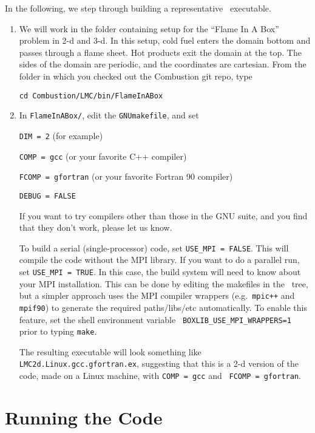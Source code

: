 In the following, we step through building a representative \lmc\ executable.
\begin{enumerate}
\item We will work in the folder containing setup for the ``Flame In A Box'' problem in 2-d and 3-d.
In this setup, cold fuel enters the domain bottom and passes through a flame sheet.
Hot products exit the domain at the top.  The sides of the domain are periodic, and the coordinates are
cartesian. From the folder in which you checked out the {\sf Combustion} git repo,
  type
\begin{verbatim}
cd Combustion/LMC/bin/FlameInABox
\end{verbatim}

\item In {\tt FlameInABox/}, edit the {\tt GNUmakefile}, and set

{\tt DIM = 2} (for example)

{\tt COMP = gcc} (or your favorite C++ compiler)

{\tt FCOMP = gfortran} (or your favorite Fortran 90 compiler)

{\tt DEBUG = FALSE}

If you want to try compilers other than those in the GNU suite, and you find that they don't
work, please let us know.

To build a serial (single-processor) code, set {\tt USE\_MPI = FALSE}.
This will compile the code without the MPI library.  If you want to do
a parallel run, set {\tt USE\_MPI = TRUE}.  In this
case, the build system will need to know about your MPI installation.
This can be done by editing the makefiles in the \boxlib\ tree, but a
simpler approach uses the MPI compiler wrappers
(e.g.\ {\tt mpic++} and {\tt mpif90}) to generate the 
required paths\slash libs\slash etc automatically.  To enable this
feature, set the shell environment variable {\tt
  BOXLIB\_USE\_MPI\_WRAPPERS=1} prior to typing {\tt make}.

  The resulting executable will look something like {\tt
    LMC2d.Linux.gcc.gfortran.ex}, suggesting that this is a 2-d version
  of the code, made on a Linux machine, with {\tt COMP = gcc} and {\tt
    FCOMP = gfortran}.

\end{enumerate}

\section{Running the Code}

